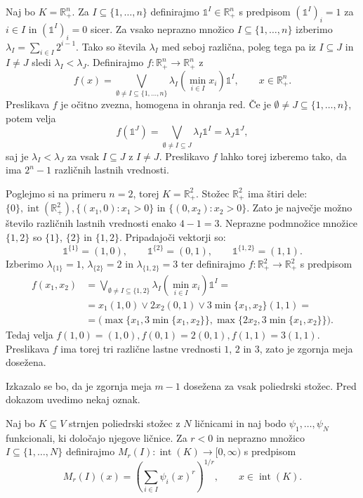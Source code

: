 \documentclass[mat2, tisk]{fmfdelo}
\newcommand{\R}{\mathbb{R}}
\begin{document}
\begin{zgled}
  Naj bo $K=\R_+^n$. Za $I\subseteq\{1,\ldots,n\}$ definirajmo $\mathds{1}^I\in\R_+^n$ s
  predpisom
  $ (\mathds{1}^I)_i=1$ za $i\in I$ in $(\mathds{1}^I)_i=0$ sicer.
  Za vsako neprazno množico $I\subseteq\{1,\ldots,n\}$ izberimo
  $\lambda_I=\sum_{i\in I}2^{i-1}$. Tako so števila $\lambda_I$
  med seboj različna, poleg tega pa iz $I\subseteq J$ in
  $I\neq J$ sledi $\lambda_I<\lambda_J$. Definirajmo $f\colon\R_+^n\longrightarrow\R_+^n$ z
  \[
  f(x)=
  \bigvee_{\emptyset\neq I\subseteq\{1,\ldots,n\}}
  \lambda_I\left(\min_{i\in I}x_i\right)\mathds{1}^I,
  \qquad x\in\R_+^n.
  \]
  Preslikava $f$ je očitno zvezna, homogena in ohranja red. Če je
  $\emptyset\neq J\subseteq\{1,\ldots,n\}$, potem velja
  \[
  f(\mathds{1}^J)
  =
  \bigvee_{\emptyset\neq I\subseteq J}\lambda_I\mathds{1}^I
  =
  \lambda_J\mathds{1}^J,
  \]
  saj je $\lambda_I<\lambda_J$ za vsak $I\subseteq J$ z $I\neq J$.
  Preslikavo $f$ lahko torej izberemo tako, da ima $2^n-1$ različnih
  lastnih vrednosti.

  Poglejmo si na primeru $n=2$, torej $K=\R_+^2$. 
  Stožec $\mathbb{R}_+^2$ ima štiri dele:
  $\{0\}, \operatorname{int}(\mathbb{R}_+^2), \{(x_1,0):x_1>0\}$ in $\{(0,x_2):x_2>0\}$.
  Zato je največje možno število različnih lastnih vrednosti enako
  $4-1=3$.
  Neprazne podmnožice množice $\{1,2\}$ so
  $\{1\}$, $\{2\}$ in $\{1,2\}$. Pripadajoči vektorji so:
  \[
  \mathds{1}^{\{1\}}=(1,0), \qquad
  \mathds{1}^{\{2\}}=(0,1), \qquad
  \mathds{1}^{\{1,2\}}=(1,1).
  \]
  Izberimo
  $\lambda_{\{1\}}=1$, $\lambda_{\{2\}}=2$ in
  $\lambda_{\{1,2\}}=3$ ter definirajmo
  $f\colon\mathbb{R}_+^2\longrightarrow\mathbb{R}_+^2$ s predpisom
  \begin{align*}
  f(x_1,x_2)
  &=\bigvee_{\emptyset\neq I\subseteq\{1,2\}}
  \lambda_I\left(\min_{i\in I}x_i\right)\mathds{1}^I =\\
  &=
  x_1(1,0)
  \vee
  2x_2(0,1)
  \vee
  3\min\{x_1,x_2\}(1,1) =\\
  &=
  \bigl(
  \max\{x_1,3\min\{x_1,x_2\}\},
  \max\{2x_2,3\min\{x_1,x_2\}\}
  \bigr).
  \end{align*}
  Tedaj velja $f(1,0)=(1,0), f(0,1)=2(0,1), f(1,1)=3(1,1)$.
  Preslikava $f$ ima torej tri različne lastne vrednosti $1$, $2$ in $3$,
  zato je zgornja meja dosežena.
\end{zgled}

Izkazalo se bo, da je zgornja meja $m-1$ dosežena za vsak poliedrski
stožec. Pred dokazom uvedimo nekaj oznak. 

\begin{definicija}
  Naj bo $K\subseteq V$ strnjen
  poliedrski stožec z $N$ ličnicami in naj bodo
  $\psi_1,\ldots,\psi_N$ funkcionali, ki določajo njegove ličnice. Za
  $r<0$ in neprazno množico $I\subseteq\{1,\ldots,N\}$ definirajmo
  $M_r(I)\colon\operatorname{int}(K)\longrightarrow[0,\infty)$ s predpisom
  \[
  M_r(I)(x)
  =
  \left(\sum_{i\in I}\psi_i(x)^r\right)^{1/r},
  \qquad x\in\operatorname{int}(K).
  \]
\end{definicija}
\end{document}
